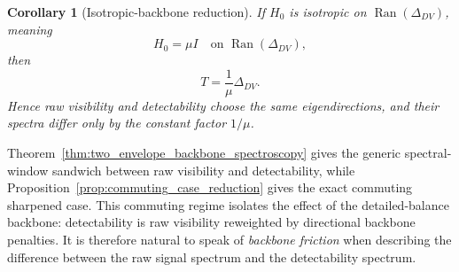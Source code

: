 \documentclass[11pt,a4paper]{article}
\numberwithin{equation}{section}
\theoremstyle{thmcompact}
\newtheorem{corollary}[theorem]{Corollary}
\theoremstyle{remark}
\begin{document}
\begin{corollary}[Isotropic-backbone reduction]
\label{cor:isotropic_backbone_reduction}
If \(H_0\) is isotropic on \(\operatorname{Ran}(\Delta_{DV})\), meaning
\begin{equation}
H_0=\mu I
\quad\text{on } \operatorname{Ran}(\Delta_{DV}),
\end{equation}
then
\begin{equation}
T=\frac{1}{\mu}\Delta_{DV}.
\end{equation}
Hence raw visibility and detectability choose the same eigendirections, and their spectra differ only by the constant factor \(1/\mu\).
\end{corollary}

Theorem~\ref{thm:two_envelope_backbone_spectroscopy} gives the generic spectral-window sandwich between raw visibility and detectability, while Proposition~\ref{prop:commuting_case_reduction} gives the exact commuting sharpened case. This commuting regime isolates the effect of the detailed-balance backbone: detectability is raw visibility reweighted by directional backbone penalties. It is therefore natural to speak of \emph{backbone friction} when describing the difference between the raw signal spectrum and the detectability spectrum.
\end{document}
